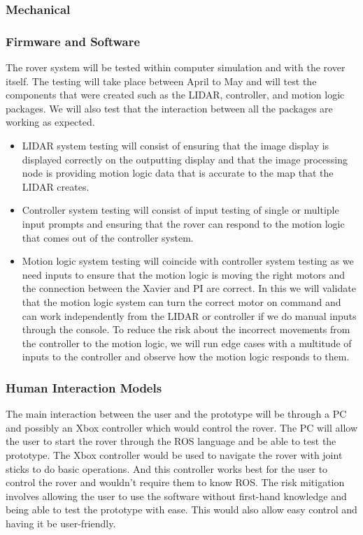 \documentclass[a4paper, 10pt]{article}
\begin{document}
		\subsubsection{Mechanical}
		\subsubsection{Firmware and Software}
		The rover system will be tested within computer simulation and with the rover itself. The testing will take place between April to May and will test the components that were created such as the LIDAR, controller, and motion logic packages. We will also test that the interaction between all the packages are working as expected. 
		
\begin{itemize}
\item
	LIDAR system testing will consist of ensuring that the image display is displayed correctly on the outputting display and that the image processing node is providing motion logic data that is accurate to the map that the LIDAR creates.
	
\item
	Controller system testing will consist of input testing of single or multiple input prompts and ensuring that the rover can respond to the motion logic that comes out of the controller system. 
	
\item
	Motion logic system testing will coincide with controller system testing as we need inputs to ensure that the motion logic is moving the right motors and the connection between the Xavier and PI are correct. In this we will validate that the motion logic system can turn the correct motor on command and can work independently from the LIDAR or controller if we do manual inputs through the console. To reduce the risk about the incorrect movements from the controller to the motion logic, we will run edge cases with a multitude of inputs to the controller and observe how the motion logic responds to them.
\end{itemize}

		\subsubsection{Human Interaction Models}
		The main interaction between the user and the prototype will be through a PC and possibly an Xbox controller which would control the rover. The PC will allow the user to start the rover through the ROS language and be able to test the prototype. The Xbox controller would be used to navigate the rover with joint sticks to do basic operations. And this controller works best for the user to control the rover and wouldn't require them to know ROS. The risk mitigation involves allowing the user to use the software without first-hand knowledge and being able to test the prototype with ease. This would also allow easy control and having it be user-friendly.
\end{document}
